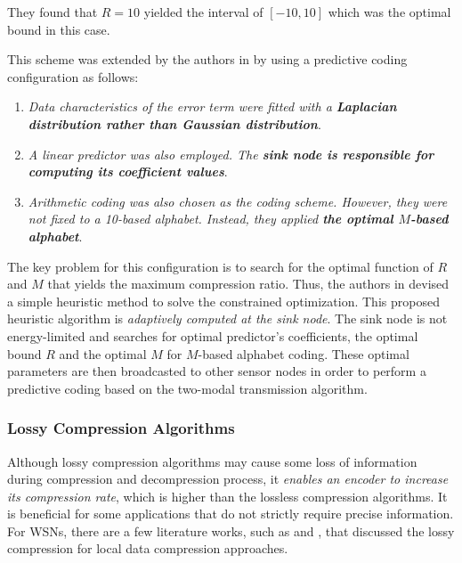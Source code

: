 \begin{enumerate}
        They found that $R=10$ yielded the interval of $\left[ -10,10 \right]$ which was the optimal bound in this case. 

        This scheme was extended by the authors in \cite{Liang2010} by using a predictive coding configuration as follows: 
        \begin{enumerate}
            \item \emph{\textcolor[rgb]{1,0,0}{Data characteristics of the error term were fitted with a \textbf{Laplacian distribution rather than Gaussian distribution}}}.
            \item \emph{\textcolor[rgb]{1,0,0}{A linear predictor was also employed. The \textbf{sink node is responsible for computing its coefficient values}}}.
            \item \emph{\textcolor[rgb]{1,0,0}{Arithmetic coding was also chosen as the coding scheme. However, they were not fixed to a 10-based alphabet. Instead, they applied \textbf{the optimal $M$-based alphabet}}}.
        \end{enumerate}
        The key problem for this configuration is to \textcolor[rgb]{1,0,0}{search for the optimal function of $R$ and $M$ that yields the maximum compression ratio}. Thus, the authors in \cite{Liang2010} devised a simple heuristic method to solve the constrained optimization. This proposed heuristic algorithm is \emph{\textcolor[rgb]{1,0,0}{adaptively computed at the sink node}}. The sink node is not energy-limited and searches for optimal predictor's coefficients, the optimal bound $R$ and the optimal $M$ for $M$-based alphabet coding. These optimal parameters are then broadcasted to other sensor nodes in order to perform a predictive coding based on the two-modal transmission algorithm.
\end{enumerate}


\subsubsection{Lossy Compression Algorithms}

Although lossy compression algorithms may cause some loss of information during compression and decompression process, it \emph{\textcolor[rgb]{1,0,0}{enables an encoder to increase its compression rate}}, which is higher than the lossless compression algorithms. It is beneficial for some applications that do not strictly require precise information. For WSNs, there are a few literature works, such as \cite{Schoellhammer2004} and \cite{Marcelloni:2010aa}, that discussed the lossy compression for \textcolor[rgb]{1,0,0}{local data compression approaches}.

